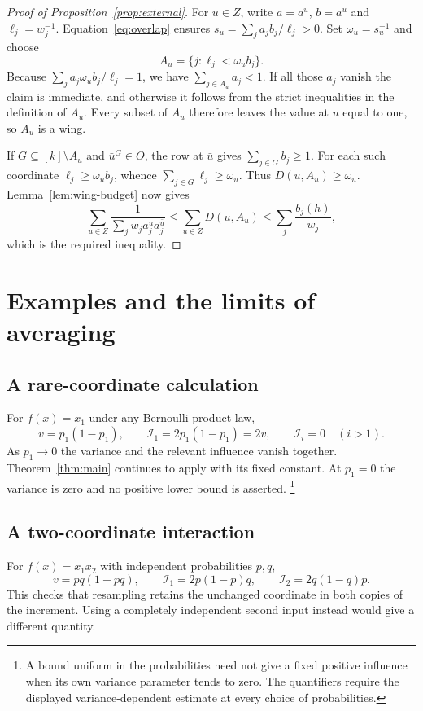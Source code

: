 \documentclass[11pt,reqno]{amsart}
\theoremstyle{definition}
\theoremstyle{remark}
\newcommand{\cI}{\mathcal I}
\numberwithin{equation}{section}
\begin{document}
\begin{proof}[Proof of Proposition~\ref{prop:external}]
For $u\in Z$, write $a=a^u$, $b=a^{\bar u}$ and
$\ell_j=w_j^{-1}$. Equation~\eqref{eq:overlap} ensures
$s_u=\sum_j a_jb_j/\ell_j>0$. Set $\omega_u=s_u^{-1}$ and choose
\[
 A_u=\{j:\ell_j<\omega_u b_j\}.
\]
Because $\sum_j a_j\omega_u b_j/\ell_j=1$, we have
$\sum_{j\in A_u}a_j<1$. If all those $a_j$ vanish the claim is
immediate, and otherwise it follows from the strict inequalities in
the definition of $A_u$. Every subset of $A_u$ therefore leaves the
value at $u$ equal to one, so $A_u$ is a wing.

If $G\subseteq[k]\setminus A_u$ and $\bar u^G\in O$, the row at
$\bar u$ gives $\sum_{j\in G}b_j\ge1$.
For each such coordinate $\ell_j\ge\omega_u b_j$, whence
$\sum_{j\in G}\ell_j\ge\omega_u$. Thus $D(u,A_u)\ge\omega_u$.
Lemma~\ref{lem:wing-budget} now gives
\[
 \sum_{u\in Z}\frac1{\sum_j w_j a_j^u a_j^{\bar u}}
 \le\sum_{u\in Z}D(u,A_u)\le\sum_j\frac{b_j(h)}{w_j},
\]
which is the required inequality.
\end{proof}

\section{Examples and the limits of averaging}

\subsection{A rare-coordinate calculation}
For $f(x)=x_1$ under any Bernoulli product law,
\[
 v=p_1(1-p_1),\qquad\cI_1=2p_1(1-p_1)=2v,
 \qquad\cI_i=0\quad(i>1).
\]
As $p_1\to0$ the variance and the relevant influence vanish together.
Theorem~\ref{thm:main} continues to apply with its fixed constant.
At $p_1=0$ the variance is zero and no positive lower bound is asserted.
\footnote{A bound uniform in the probabilities need not give a fixed
positive influence when its own variance parameter tends to zero. The
quantifiers require the displayed variance-dependent estimate at every
choice of probabilities.}

\subsection{A two-coordinate interaction}
For $f(x)=x_1x_2$ with independent probabilities $p,q$,
\[
 v=pq(1-pq),\qquad
 \cI_1=2p(1-p)q,\qquad\cI_2=2q(1-q)p.
\]
This checks that resampling retains the unchanged coordinate in both
copies of the increment. Using a completely independent second input
instead would give a different quantity.
\end{document}
